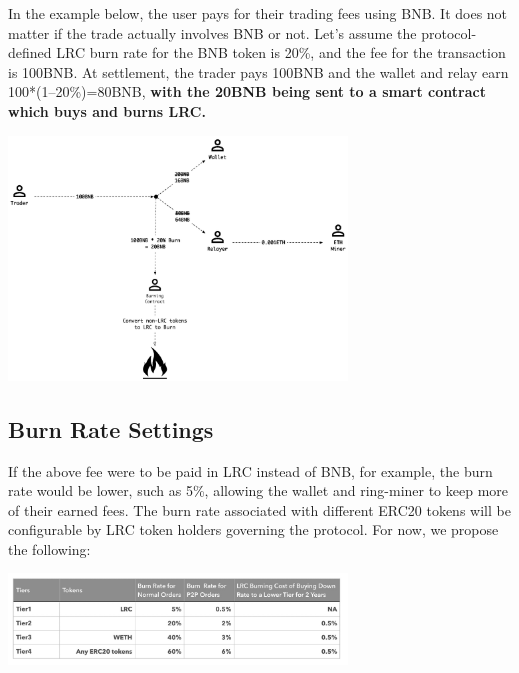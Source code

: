 \documentclass[UTF8,nofonts]{article}
\makeatletter
\newenvironment{figurehere}
 {\def\@captype{figure}}
 {}
\makeatother
\begin{document}
\begin{multicols}{2}
\begin{appendices}
In the example below, the user pays for their trading fees using BNB. It does not matter if the trade actually involves BNB or not. Let’s assume the protocol-defined LRC burn rate for the BNB token is 20\%, and the fee for the transaction is 100BNB. At settlement, the trader pays 100BNB and the wallet and relay earn 100*(1–20\%)=80BNB, \textbf{with the 20BNB being sent to a smart contract which buys and burns LRC.} 


\begin{center}
\begin{figurehere}
\centering

\includegraphics[width=9cm]{1.png}

\caption{Fee model in Loopring protocol 2.0}
\end{figurehere}
\end{center}


\subsection{Burn Rate Settings}
If the above fee were to be paid in LRC instead of BNB, for example, the burn rate would be lower, such as 5\%, allowing the wallet and ring-miner to keep more of their earned fees. The burn rate associated with different ERC20 tokens will be configurable by LRC token holders governing the protocol. For now, we propose the following:

\begin{center}
\begin{figurehere}
\centering

\includegraphics[width=9cm]{2.png}


\end{figurehere}
\end{center}
\end{appendices}
\end{multicols}
\end{document}
